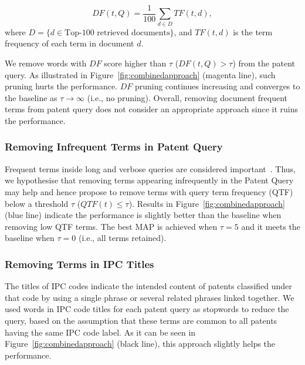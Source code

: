 \begin{equation}
 DF(t, Q)=\frac{1}{100}\sum_{d\in  D} TF(t, d),    
 \label{eq:df}
\end{equation}
where $D=\{d\in \mbox{Top-100 retrieved documents}\}$, and $TF(t, d)$ is the term frequency of each term in document $d$.

We remove words with $\mathit{DF}$ score higher than $\tau$ ($DF(t, Q)>\tau$) from the patent query. 
As illustrated in Figure~\ref{fig:combinedapproach} (magenta line), such pruning hurts the performance. $\mathit{DF}$ pruning continues increasing and converges to the baseline as $\tau \to \infty $ (i.e., no pruning).
Overall, removing document frequent terms from patent query does not consider an appropriate approach since it ruins the performance. 
\subsubsection{Removing Infrequent Terms in Patent Query}
Frequent terms inside long and verbose queries are considered important~\cite{maxwell2013compact}. Thus, we hypothesise that removing terms appearing infrequently in the Patent Query may help and hence propose to remove terms with query term frequency (QTF) below a threshold $\tau$ ($QTF(t) \leq \tau$). Results in Figure~\ref{fig:combinedapproach} (blue line) indicate the performance is slightly better than the baseline when removing low QTF terms.  The best MAP is achieved when $\tau=5$ and it meets the baseline when $\tau=0$ (i.e., all terms retained). 
\subsubsection{Removing Terms in IPC Titles}
The titles of IPC codes indicate the intended content of patents classified under that code by using a single phrase or several related phrases linked together. We used words in IPC code titles for each patent query as stopwords to reduce the query, based on the assumption that these terms are common to all patents having the same IPC code label.  As it can be seen in Figure~\ref{fig:combinedapproach} (black line), this approach slightly helps the performance.
